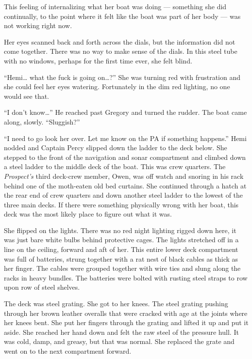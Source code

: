\documentclass[]{scrbook}
\begin{document}
This feeling of internalizing what her boat was doing --- something she
did continually, to the point where it felt like the boat was part of
her body --- was not working right now.

Her eyes scanned back and forth across the dials, but the information
did not come together. There was no way to make sense of the dials. In
this steel tube with no windows, perhaps for the first time ever, she
felt blind.

``Hemi\ldots{} what the fuck is going on\ldots{}?'' She was turning red
with frustration and she could feel her eyes watering. Fortunately in
the dim red lighting, no one would see that.

``I don't know\ldots{}'' He reached past Gregory and turned the rudder.
The boat came along, slowly. ``Sluggish?''

``I need to go look her over. Let me know on the PA if something
happens.'' Hemi nodded and Captain Percy slipped down the ladder to the
deck below. She stepped to the front of the navigation and sonar
compartment and climbed down a steel ladder to the middle deck of the
boat. This was crew quarters. The \emph{Prospect's} third deck-crew
member, Owen, was off watch and snoring in his rack behind one of the
moth-eaten old bed curtains. She continued through a hatch at the rear
end of crew quarters and down another steel ladder to the lowest of the
three main decks. If there were something physically wrong with her
boat, this deck was the most likely place to figure out what it was.

She flipped on the lights. There was no red night lighting rigged down
here, it was just bare white bulbs behind protective cages. The lights
stretched off in a line on the ceiling, forward and aft of her. This
entire lower deck compartment was full of batteries, strung together
with a rat nest of black cables as thick as her finger. The cables were
grouped together with wire ties and slung along the racks in heavy
bundles. The batteries were bolted with rusting steel straps to row upon
row of steel shelves.

The deck was steel grating. She got to her knees. The steel grating
pushing through her brown leather overalls that were cracked with age at
the joints where her knees bent. She put her fingers through the grating
and lifted it up and put it aside. She reached her hand down and felt
the raw steel of the pressure hull. It was cold, damp, and greasy, but
that was normal. She replaced the grate and went on to the next
compartment forward.
\end{document}
